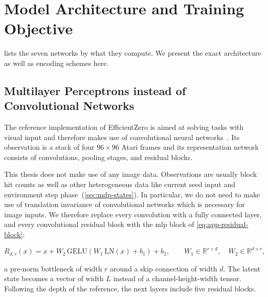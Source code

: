 
\chapter{Model Architecture and Training Objective}\label{app:ez-details}


 lists the seven networks by what they compute.
We present the exact architecture as well as encoding schemes here.

\section{Multilayer Perceptrons instead of Convolutional Networks}\label{sec:app-ez-mlp}

The reference implementation of EfficientZero is aimed at solving tasks with visual input
and therefore makes use of convolutional neural networks~\cite{ye_mastering_2021}.
Its observation is a stack of four $96\times96$ Atari frames and its representation
network consists of convolutions, pooling stages, and residual blocks.

This thesis does not make use of any image data.
Observations are usually block hit counts as well as other heterogeneous data like current
seed input and environment step phase~(\cref{sec:mdp-states}).
In particular, we do not need to make use of translation invariance of convolutional networks
which is necessary for image inputs.
We therefore replace every convolution with a fully connected layer, and every convolutional
residual block with the \gls{mlp} block of \cref{eq:app-residual-block}:

\begin{equation}\label{eq:app-residual-block}
  R_{d,r}(x) = x + W_2\,\mathrm{GELU}\!\left(W_1\,\mathrm{LN}(x)+b_1\right)+b_2,
  \qquad W_1\in\mathbb{R}^{r\times d},\quad W_2\in\mathbb{R}^{d\times r},
\end{equation}

a pre-norm bottleneck of width $r$ around a skip connection of width $d$.
The latent state becomes a vector of width $L$ instead of a channel-height-width tensor.
Following the depth of the reference, the next layers include five residual blocks.

